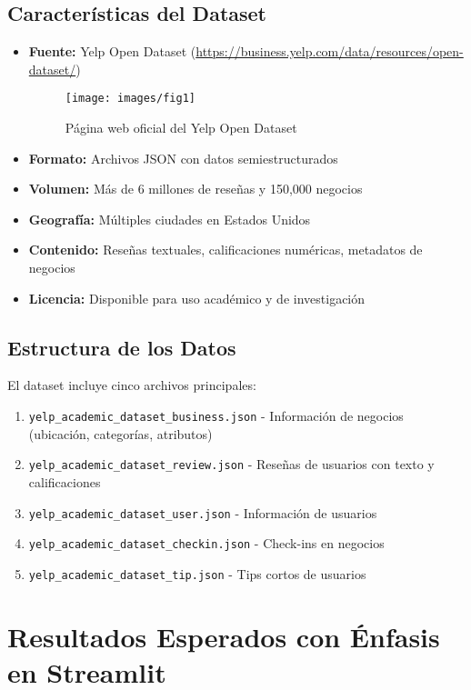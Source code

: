 \documentclass[12pt,a4paper]{article}
\begin{document}
\subsection{Características del Dataset}

\begin{itemize}[label=\textbullet]
    \item \textbf{Fuente:} Yelp Open Dataset (\url{https://business.yelp.com/data/resources/open-dataset/})
    
    \begin{figure}[h!]
        \centering
        \texttt{[image: images/fig1]}
        \caption{Página web oficial del Yelp Open Dataset}
    \end{figure}
    \item \textbf{Formato:} Archivos JSON con datos semiestructurados
    \item \textbf{Volumen:} Más de 6 millones de reseñas y 150,000 negocios
    \item \textbf{Geografía:} Múltiples ciudades en Estados Unidos
    \item \textbf{Contenido:} Reseñas textuales, calificaciones numéricas, metadatos de negocios
    \item \textbf{Licencia:} Disponible para uso académico y de investigación
\end{itemize}

\subsection{Estructura de los Datos}

El dataset incluye cinco archivos principales:
\begin{enumerate}
    \item \texttt{yelp\_academic\_dataset\_business.json} - Información de negocios (ubicación, categorías, atributos)
    \item \texttt{yelp\_academic\_dataset\_review.json} - Reseñas de usuarios con texto y calificaciones
    \item \texttt{yelp\_academic\_dataset\_user.json} - Información de usuarios
    \item \texttt{yelp\_academic\_dataset\_checkin.json} - Check-ins en negocios
    \item \texttt{yelp\_academic\_dataset\_tip.json} - Tips cortos de usuarios
\end{enumerate}

\section{Resultados Esperados con Énfasis en Streamlit}
\end{document}
